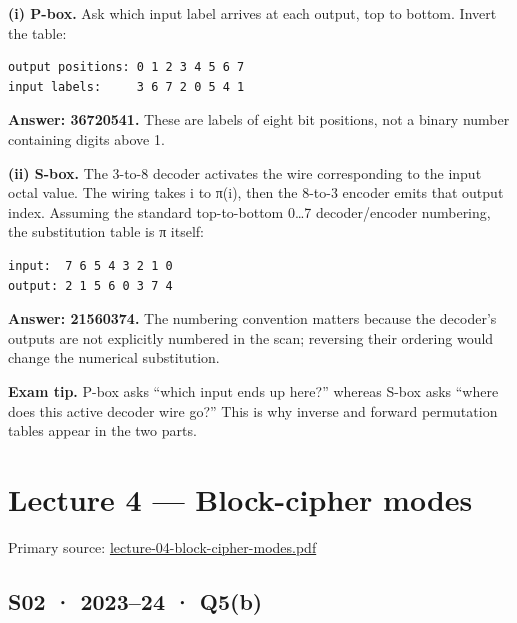 \documentclass[11pt,a4paper]{article}
\begin{document}
\textbf{(i) P-box.} Ask which input label arrives at each output,\allowbreak{} top to bottom. Invert the table:



\begin{Verbatim}[breaklines=true,breakanywhere=true,fontsize=\small,frame=single,rulecolor=\color{PanelBorder}]
output positions: 0 1 2 3 4 5 6 7
input labels:     3 6 7 2 0 5 4 1
\end{Verbatim}

\textbf{Answer: 36720541.} These are labels of eight bit positions,\allowbreak{} not a binary number containing digits above 1.


\textbf{(ii) S-box.} The 3-to-8 decoder activates the wire corresponding to the input octal value. The wiring takes i to π(i),\allowbreak{} then the 8-to-3 encoder emits that output index. Assuming the standard top-to-bottom 0…7 decoder/\allowbreak{}encoder numbering,\allowbreak{} the substitution table is π itself:



\begin{Verbatim}[breaklines=true,breakanywhere=true,fontsize=\small,frame=single,rulecolor=\color{PanelBorder}]
input:  7 6 5 4 3 2 1 0
output: 2 1 5 6 0 3 7 4
\end{Verbatim}

\textbf{Answer: 21560374.} The numbering convention matters because the decoder’s outputs are not explicitly numbered in the scan; reversing their ordering would change the numerical substitution.



{\color{ForestGreen}\textbf{Exam tip.} P-box asks “which input ends up here?” whereas S-box asks “where does this active decoder wire go?” This is why inverse and forward permutation tables appear in the two parts.}



\clearpage
\section{Lecture 4 — Block-cipher modes}

Primary source: \href{../slides/lecture-04-block-cipher-modes.pdf}{lecture-04-block-cipher-modes.\allowbreak{}pdf}




\subsection{S02 · 2023–24 · Q5(b)}\label{s02}
\end{document}
